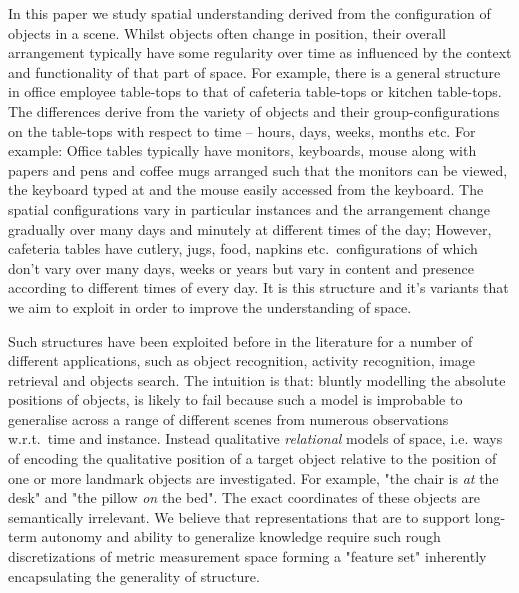 \documentclass[letterpaper, 10 pt, conference]{ieeeconf}  %
\begin{document}
In this paper we study spatial understanding derived from the 
configuration of objects in a scene. Whilst objects often change 
in position, their overall arrangement typically have some regularity 
over time as influenced by the context and functionality of that 
part of space. For example, there is a general structure in office 
employee table-tops to that of cafeteria table-tops or kitchen table-tops.
The differences derive from the variety of objects and their 
group-configurations on the table-tops with respect to time -- hours, 
days, weeks, months etc. For example: Office tables typically 
have monitors, keyboards, mouse along with papers and pens 
and coffee mugs arranged such that the monitors can be viewed, the 
keyboard typed at and the mouse easily accessed from the keyboard. 
The spatial configurations vary in particular instances and the 
arrangement change gradually over many days and minutely at different 
times of the day; However, cafeteria tables have cutlery, jugs, food, 
napkins etc.\ configurations of which don't vary over many days, 
weeks or years but vary in content and presence according to different 
times of every day. It is this structure and it's variants that we aim 
to exploit in order to improve the understanding of space.

Such structures have been exploited before in the literature for a
number of different applications, such as object recognition, activity
recognition, image retrieval and objects search. The intuition is that:
bluntly modelling the absolute positions of objects, is likely to fail
because such a model is improbable to generalise across a range of
different scenes from numerous observations w.r.t.\ time and instance. Instead
qualitative \emph{relational} models of space, i.e. ways of encoding
the qualitative position of a target object relative to the position
of one or more landmark objects are investigated. For example, "the
chair is \textit{at} the desk" and "the pillow \textit{on} the bed". 
The exact coordinates of these objects are semantically irrelevant. We believe that 
representations that are to support long-term autonomy and ability 
to generalize knowledge require such rough discretizations of metric 
measurement space forming a "feature set" inherently encapsulating the generality
of structure.
\end{document}
